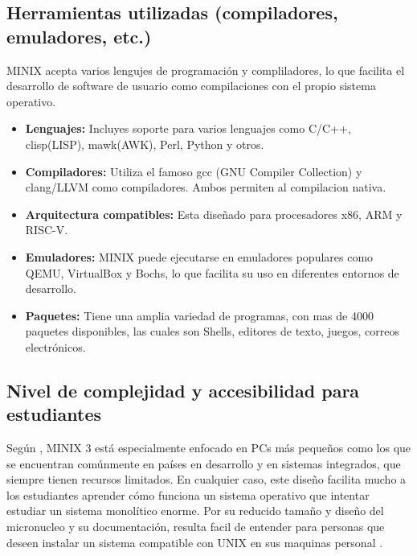 \subsection{Herramientas utilizadas (compiladores, emuladores, etc.)}
MINIX acepta varios lengujes de programación y compliladores, lo que facilita  el desarrollo de software de usuario como compilaciones con el propio sistema operativo. \citep{minix_wiki_features}
\begin{itemize}
    \item \textbf{Lenguajes:} Incluyes soporte para varios lenguajes como C/C++, clisp(LISP), mawk(AWK), Perl, Python y otros. 
    \item \textbf{Compiladores:} Utiliza el famoso gcc (GNU Compiler Collection) y clang/LLVM como compiladores. Ambos permiten al compilacion nativa.
    \item \textbf{Arquitectura compatibles:} Esta diseñado para procesadores x86, ARM y RISC-V.
    \item \textbf{Emuladores:} MINIX puede ejecutarse en emuladores populares como QEMU, VirtualBox y Bochs, lo que facilita su uso en diferentes entornos de desarrollo.
    \item \textbf{Paquetes:} Tiene una amplia variedad de programas, con mas de 4000 paquetes disponibles, las cuales son Shells, editores de texto, juegos, correos electrónicos.
\end{itemize}

\subsection{Nivel de complejidad y accesibilidad para estudiantes}
Según \citep[pag. 17]{tanenbaum2006}, MINIX 3 está especialmente enfocado en PCs más pequeños como los que se encuentran comúnmente en países en desarrollo y en sistemas integrados, que siempre tienen recursos limitados. En cualquier caso, este diseño facilita mucho a los estudiantes aprender cómo funciona un sistema operativo que intentar estudiar un sistema monolítico enorme.
Por su reducido tamaño y diseño del micronucleo y su documentación, resulta facil de entender para personas que deseen instalar un sistema compatible con UNIX en sus maquinas personal \citep{wikipedia_minix_es}.